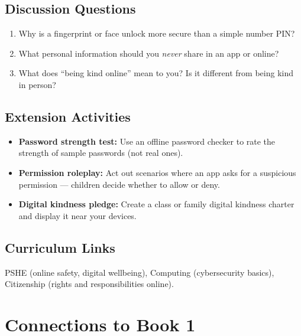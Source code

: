 \subsection*{Discussion Questions}
\begin{enumerate}
  \item Why is a fingerprint or face unlock more secure than a simple number PIN?
  \item What personal information should you \emph{never} share in an app or online?
  \item What does ``being kind online'' mean to you? Is it different from being kind in person?
\end{enumerate}

\subsection*{Extension Activities}
\begin{itemize}
  \item \textbf{Password strength test:} Use an offline password checker to rate the strength of sample passwords (not real ones).
  \item \textbf{Permission roleplay:} Act out scenarios where an app asks for a suspicious permission — children decide whether to allow or deny.
  \item \textbf{Digital kindness pledge:} Create a class or family digital kindness charter and display it near your devices.
\end{itemize}

\subsection*{Curriculum Links}
PSHE (online safety, digital wellbeing), Computing (cybersecurity basics), Citizenship (rights and responsibilities online).

\sectionrule

\section*{Connections to Book 1}

